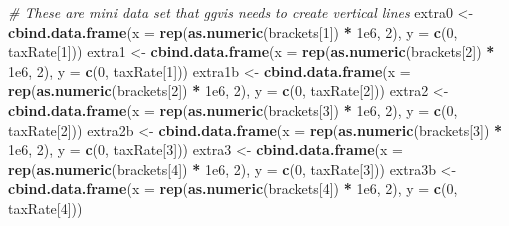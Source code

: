 \documentclass[]{article}
\newenvironment{Shaded}{\begin{snugshade}}{\end{snugshade}}
\newcommand{\CommentTok}[1]{\textcolor[rgb]{0.56,0.35,0.01}{\textit{#1}}}
\newcommand{\DataTypeTok}[1]{\textcolor[rgb]{0.13,0.29,0.53}{#1}}
\newcommand{\DecValTok}[1]{\textcolor[rgb]{0.00,0.00,0.81}{#1}}
\newcommand{\FloatTok}[1]{\textcolor[rgb]{0.00,0.00,0.81}{#1}}
\newcommand{\KeywordTok}[1]{\textcolor[rgb]{0.13,0.29,0.53}{\textbf{#1}}}
\newcommand{\NormalTok}[1]{#1}
\newcommand{\OperatorTok}[1]{\textcolor[rgb]{0.81,0.36,0.00}{\textbf{#1}}}
\newcommand{\StringTok}[1]{\textcolor[rgb]{0.31,0.60,0.02}{#1}}
\begin{document}
\begin{Shaded}
\begin{Highlighting}[]
  
\CommentTok{# These are mini data set that ggvis needs to create vertical lines}
\NormalTok{extra0 <-}\StringTok{ }\KeywordTok{cbind.data.frame}\NormalTok{(}\DataTypeTok{x =} \KeywordTok{rep}\NormalTok{(}\KeywordTok{as.numeric}\NormalTok{(brackets[}\DecValTok{1}\NormalTok{]) }\OperatorTok{*}\StringTok{ }\FloatTok{1e6}\NormalTok{, }\DecValTok{2}\NormalTok{), }\DataTypeTok{y =} \KeywordTok{c}\NormalTok{(}\DecValTok{0}\NormalTok{, taxRate[}\DecValTok{1}\NormalTok{]))}
\NormalTok{extra1 <-}\StringTok{ }\KeywordTok{cbind.data.frame}\NormalTok{(}\DataTypeTok{x =} \KeywordTok{rep}\NormalTok{(}\KeywordTok{as.numeric}\NormalTok{(brackets[}\DecValTok{2}\NormalTok{]) }\OperatorTok{*}\StringTok{ }\FloatTok{1e6}\NormalTok{, }\DecValTok{2}\NormalTok{), }\DataTypeTok{y =} \KeywordTok{c}\NormalTok{(}\DecValTok{0}\NormalTok{, taxRate[}\DecValTok{1}\NormalTok{]))}
\NormalTok{extra1b <-}\StringTok{ }\KeywordTok{cbind.data.frame}\NormalTok{(}\DataTypeTok{x =} \KeywordTok{rep}\NormalTok{(}\KeywordTok{as.numeric}\NormalTok{(brackets[}\DecValTok{2}\NormalTok{]) }\OperatorTok{*}\StringTok{ }\FloatTok{1e6}\NormalTok{, }\DecValTok{2}\NormalTok{), }\DataTypeTok{y =} \KeywordTok{c}\NormalTok{(}\DecValTok{0}\NormalTok{, taxRate[}\DecValTok{2}\NormalTok{]))}
\NormalTok{extra2 <-}\StringTok{ }\KeywordTok{cbind.data.frame}\NormalTok{(}\DataTypeTok{x =} \KeywordTok{rep}\NormalTok{(}\KeywordTok{as.numeric}\NormalTok{(brackets[}\DecValTok{3}\NormalTok{]) }\OperatorTok{*}\StringTok{ }\FloatTok{1e6}\NormalTok{, }\DecValTok{2}\NormalTok{), }\DataTypeTok{y =} \KeywordTok{c}\NormalTok{(}\DecValTok{0}\NormalTok{, taxRate[}\DecValTok{2}\NormalTok{]))}
\NormalTok{extra2b <-}\StringTok{ }\KeywordTok{cbind.data.frame}\NormalTok{(}\DataTypeTok{x =} \KeywordTok{rep}\NormalTok{(}\KeywordTok{as.numeric}\NormalTok{(brackets[}\DecValTok{3}\NormalTok{]) }\OperatorTok{*}\StringTok{ }\FloatTok{1e6}\NormalTok{, }\DecValTok{2}\NormalTok{), }\DataTypeTok{y =} \KeywordTok{c}\NormalTok{(}\DecValTok{0}\NormalTok{, taxRate[}\DecValTok{3}\NormalTok{]))}
\NormalTok{extra3 <-}\StringTok{ }\KeywordTok{cbind.data.frame}\NormalTok{(}\DataTypeTok{x =} \KeywordTok{rep}\NormalTok{(}\KeywordTok{as.numeric}\NormalTok{(brackets[}\DecValTok{4}\NormalTok{]) }\OperatorTok{*}\StringTok{ }\FloatTok{1e6}\NormalTok{, }\DecValTok{2}\NormalTok{), }\DataTypeTok{y =} \KeywordTok{c}\NormalTok{(}\DecValTok{0}\NormalTok{, taxRate[}\DecValTok{3}\NormalTok{]))}
\NormalTok{extra3b <-}\StringTok{ }\KeywordTok{cbind.data.frame}\NormalTok{(}\DataTypeTok{x =} \KeywordTok{rep}\NormalTok{(}\KeywordTok{as.numeric}\NormalTok{(brackets[}\DecValTok{4}\NormalTok{]) }\OperatorTok{*}\StringTok{ }\FloatTok{1e6}\NormalTok{, }\DecValTok{2}\NormalTok{), }\DataTypeTok{y =} \KeywordTok{c}\NormalTok{(}\DecValTok{0}\NormalTok{, taxRate[}\DecValTok{4}\NormalTok{]))}


\end{Highlighting}
\end{Shaded}
\end{document}
